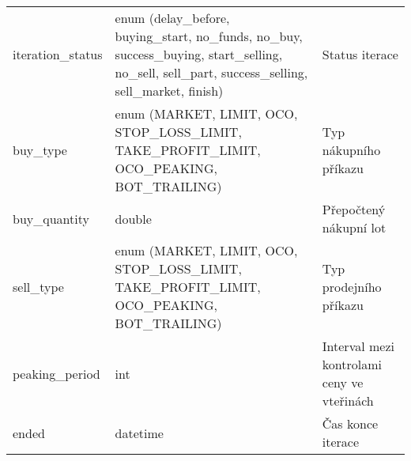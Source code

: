 \begin{center}
\begin{longtable}[t]{|l|C{4cm}|p{4cm}|}
        iteration\_status                    & enum (delay\_before, buying\_start, no\_funds, no\_buy, success\_buying, start\_selling, no\_sell, sell\_part, success\_selling, sell\_market, finish)                                                               & Status iterace                                                                                                                    \\
        buy\_type                            & enum (MARKET, LIMIT, OCO, STOP\_LOSS\_LIMIT, TAKE\_PROFIT\_LIMIT, OCO\_PEAKING, BOT\_TRAILING)                                                                                                                       & Typ nákupního příkazu                                                                                                             \\
        buy\_quantity                        & double                                                                                                                                                                                                               & Přepočtený nákupní lot                                                                                                            \\
        sell\_type                           & enum (MARKET, LIMIT, OCO, STOP\_LOSS\_LIMIT, TAKE\_PROFIT\_LIMIT, OCO\_PEAKING, BOT\_TRAILING)                                                                                                                       & Typ prodejního příkazu                                                                                                            \\
        peaking\_period                      & int                                                                                                                                                                                                                  & Interval mezi kontrolami ceny ve vteřinách                                                                                        \\
        ended                                & datetime                                                                                                                                                                                                             & Čas konce iterace                                                                                                                 \\

\end{longtable}
\end{center}
